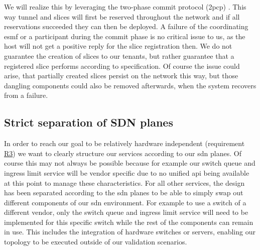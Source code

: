We will realize this by leveraging the two-phase commit protocol (\acrshort{2pcp}) \cite{2pcp}. This way tunnel and slices will first be reserved throughout the network and if all reservations succeeded they can then be deployed. A failure of the coordinating \acrshort{esmf} or a participant during the commit phase is no critical issue to us, as the host will not get a positive reply for the slice registration then. We do not guarantee the creation of slices to our tenants, but rather guarantee that a registered slice performs according to specification. Of course the issue could arise, that partially created slices persist on the network this way, but those dangling components could also be removed afterwards, when the system recovers from a failure.

\subsection{Strict separation of SDN planes}
In order to reach our goal to be relatively hardware independent (requirement \hyperref[R3]{R3}) we want to clearly structure our services according to our \acrshort{sdn} planes. Of course this may not always be possible because for example our switch queue and ingress limit service will be vendor specific due to no unified \acrshort{api} being available at this point to manage these characteristics. For all other services, the design has been separated according to the \acrshort{sdn} planes to be able to simply swap out different components of our \acrshort{sdn} environment. For example to use a switch of a different vendor, only the switch queue and ingress limit service will need to be implemented for this specific switch while the rest of the components can remain in use. This includes the integration of hardware switches or servers, enabling our topology to be executed outside of our validation scenarios.